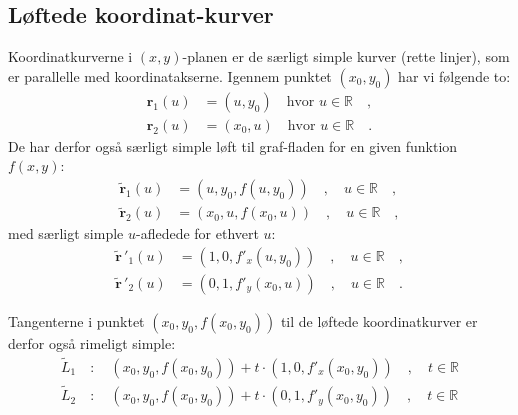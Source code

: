 \subsection{Løftede koordinat-kurver} \label{subsecLift}
Koordinatkurverne i $(x,y)$-planen er de   særligt simple kurver (rette linjer), som er parallelle med koordinatakserne. Igennem punktet $(x_{0}, y_{0})$ har vi følgende to:
\begin{equation}
\begin{aligned}
\mathbf{r}_{1}(u) &= (u, y_{0}) \quad \textrm{hvor $u \in \mathbb{R}$}\quad , \\
\mathbf{r}_{2}(u) &= (x_{0}, u) \quad \textrm{hvor $u \in \mathbb{R}$} \quad .
\end{aligned}
\end{equation}
De har derfor også særligt simple løft til graf-fladen for en given funktion $f(x,y)$:
\begin{equation}
\begin{aligned}
\widetilde{\mathbf{r}}_{1}(u) &= (u, y_{0}, f(u, y_{0})) \quad, \quad \textrm{$u \in \mathbb{R}$}\quad , \\
\widetilde{\mathbf{r}}_{2}(u) &= (x_{0}, u, f(x_{0}, u))\quad, \quad  \textrm{$u \in \mathbb{R}$} \quad ,
\end{aligned}
\end{equation}
med særligt simple $u$-afledede for ethvert $u$:
\begin{equation}
\begin{aligned}
\widetilde{\mathbf{r}}\,'_{1}(u) &= (1, 0, f'_{x}(u, y_{0}))\quad, \quad  \textrm{$u \in \mathbb{R}$}\quad , \\
\widetilde{\mathbf{r}}\,'_{2}(u) &= (0, 1, f'_{y}(x_{0}, u)) \quad, \quad \textrm{$u \in \mathbb{R}$}\quad .
\end{aligned}
\end{equation}

Tangenterne i punktet $(x_{0}, y_{0}, f(x_{0}, y_{0}))$ til de løftede koordinatkurver er derfor også rimeligt simple:
\begin{equation}
\begin{aligned}
\widetilde{L}_{1} \quad : \quad (x_{0}, y_{0}, f(x_{0}, y_{0})) + t\cdot(1, 0, f'_{x}(x_{0}, y_{0})) \quad , \quad \textrm{$t \in \mathbb{R}$} \\
\widetilde{L}_{2} \quad : \quad(x_{0}, y_{0}, f(x_{0}, y_{0})) + t\cdot(0, 1, f'_{y}(x_{0}, y_{0}))  \quad , \quad \textrm{$t \in \mathbb{R}$}
\end{aligned}
\end{equation}



